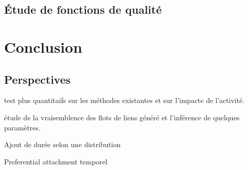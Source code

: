 \subsection{Étude de fonctions de qualité}
\label{sec:versqualite_qualite}

\section{Conclusion}


\subsection{Perspectives}

test plus quantitaifs sur les méthodes existantes et sur l'impacte de l'activité.

étude de la vraisemblence des flots de liens généré et l'inférence de quelques paramètres.

Ajout de durée selon une distribution

Preferential attachment temporel

